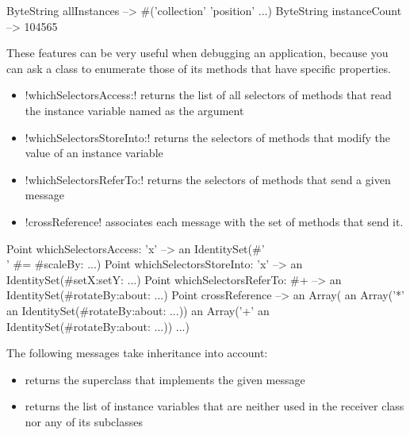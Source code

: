 \documentclass[a4paper,10pt,twoside]{book}
\begin{document}
\begin{code}{} %
ByteString allInstances     --> #('collection' 'position'  ...)
ByteString instanceCount --> 104565
\end{code}

These features can be very useful when debugging an application, because you can ask a class to enumerate those of its methods that have specific properties.
\begin{itemize}
\item \ct!whichSelectorsAccess:! returns the list of all selectors of methods that read the instance variable named as the argument
\item \ct!whichSelectorsStoreInto:! returns the selectors of methods that modify the value of an instance variable
\item \ct!whichSelectorsReferTo:! returns the selectors of methods that send a given message
\item \ct!crossReference! associates each message with the set of methods that send it.
\end{itemize}


\begin{code}{} %
Point whichSelectorsAccess: 'x'    --> an IdentitySet(#'\\' #= #scaleBy: ...)
Point whichSelectorsStoreInto: 'x' --> an IdentitySet(#setX:setY: ...)
Point whichSelectorsReferTo: #+  --> an IdentitySet(#rotateBy:about: ...)
Point crossReference --> an Array(
		an Array('*' an IdentitySet(#rotateBy:about: ...))
		an Array('+' an IdentitySet(#rotateBy:about: ...))
		...)
\end{code}

The following messages take inheritance into account:
\begin{itemize}
\item {} returns the superclass that implements the given message
\item {} returns the list of instance variables that are neither used in the receiver class nor any of its subclasses
\end{itemize}
\end{document}

